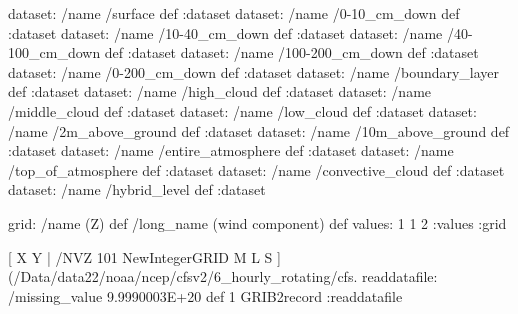 \begin{ingrid}

dataset: /name /surface def :dataset
dataset: /name /0-10_cm_down def :dataset
dataset: /name /10-40_cm_down def :dataset
dataset: /name /40-100_cm_down def :dataset
dataset: /name /100-200_cm_down def :dataset
dataset: /name /0-200_cm_down def :dataset
dataset: /name /boundary_layer def :dataset
dataset: /name /high_cloud def :dataset
dataset: /name /middle_cloud def :dataset
dataset: /name /low_cloud def :dataset
dataset: /name /2m_above_ground def :dataset
dataset: /name /10m_above_ground def :dataset
dataset: /name /entire_atmosphere def :dataset
dataset: /name /top_of_atmosphere def :dataset
dataset: /name /convective_cloud def :dataset
dataset: /name /hybrid_level def :dataset

\end{ingrid}
\begin{ingrid}

grid:
/name (Z) def
/long_name (wind component) def
values:
1 1 2
:values
:grid

[ X Y | /NVZ 101 NewIntegerGRID M L S ] 
(/Data/data22/noaa/ncep/cfsv2/6_hourly_rotating/cfs.%
readdatafile: 
/missing_value 9.9990003E+20 def
1 GRIB2record
:readdatafile

\end{ingrid}
